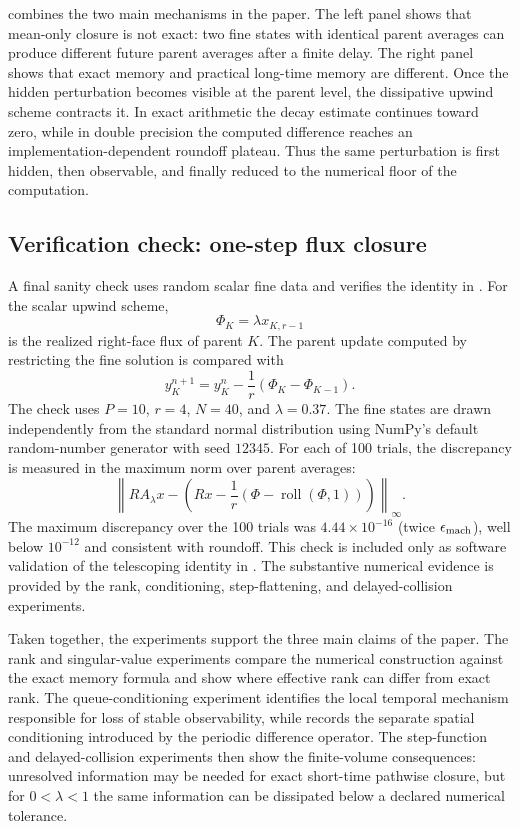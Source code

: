 \documentclass[pdflatex,sn-mathphys-num]{sn-jnl}%
\newcommand{\epsmach}{\epsilon_{\rm mach}}
\theoremstyle{thmstyleone}%
\theoremstyle{thmstyletwo}%
\theoremstyle{thmstylethree}%
\begin{document}
 combines the two main mechanisms in the paper. The left panel shows that mean-only closure is not exact: two fine states with identical parent averages can produce different future parent averages after a finite delay.  The right panel shows that exact memory and practical long-time memory are different.  Once the hidden perturbation becomes visible at the parent level, the dissipative upwind scheme contracts it.  In exact
arithmetic the decay estimate continues toward zero, while in double precision the computed difference reaches an implementation-dependent
roundoff plateau.  Thus the same perturbation is first hidden, then observable, and finally reduced to the numerical floor of the computation.

\subsection{Verification check: one-step flux closure}

A final sanity check uses random scalar fine data and verifies the identity
in .  For the scalar upwind scheme,
\[
  \Phi_{K}=\lambda x_{K,r-1}
\]
is the realized right-face flux of parent \(K\).  The parent update computed
by restricting the fine solution is compared with
\[
  y_K^{n+1}=y_K^n-\frac1r(\Phi_K-\Phi_{K-1}).
\]
The check uses \(P=10\), \(r=4\), \(N=40\), and \(\lambda=0.37\).  The fine
states are drawn independently from the standard normal distribution using
NumPy's default random-number generator with seed \(12345\).  For each of
100 trials, the discrepancy is measured in the maximum norm over parent averages:
\[
  \left\|
  R A_\lambda x
  -
  \left(
  Rx-\frac1r(\Phi-\operatorname{roll}(\Phi,1))
  \right)
  \right\|_\infty .
\]
The maximum discrepancy over the 100 trials was \(4.44\times10^{-16}\) (twice \(\epsmach\)), well below \(10^{-12}\) and consistent with roundoff. This check is included only as software validation of the telescoping
identity in .  The substantive numerical evidence is provided by the rank, conditioning, step-flattening, and delayed-collision
experiments.

Taken together, the experiments support the three main claims of the paper. The rank and singular-value experiments compare the numerical construction against the exact memory formula and show where effective rank can differ from exact rank.  The queue-conditioning experiment identifies the local temporal mechanism responsible for loss of stable observability, while  records the separate spatial conditioning introduced by the periodic difference operator.  The step-function and delayed-collision experiments then show the finite-volume consequences: unresolved information may be needed for exact short-time pathwise closure, but for \(0<\lambda<1\) the same information can be dissipated below a declared numerical tolerance.
\end{document}
